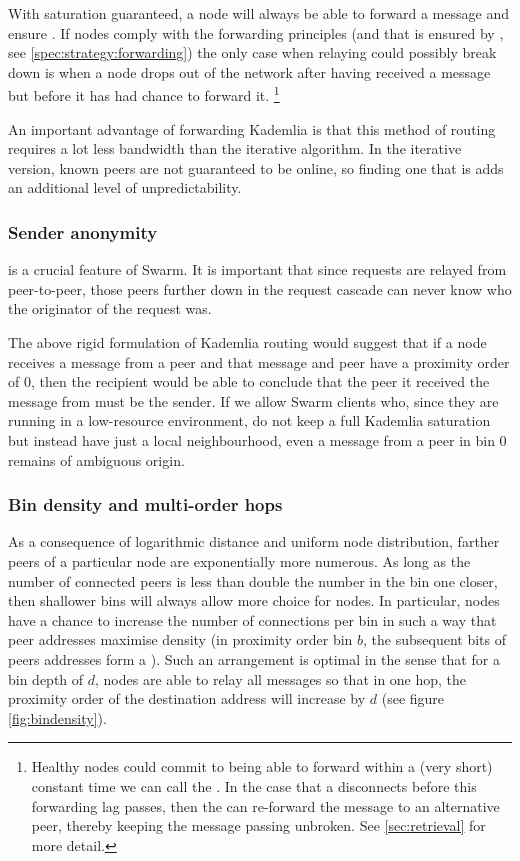 With  saturation guaranteed, a node will always be able to forward a message and ensure . If nodes comply with the forwarding principles (and that is ensured by , see \ref{spec:strategy:forwarding}) the only case when relaying could possibly break down is when a node drops out of the network after having received a message but before it has had chance to forward it.%
%
\footnote{Healthy nodes could commit to being able to forward within a (very short) constant time we can call the . In the case that a  disconnects before this forwarding lag passes, then the  can re-forward the message to an alternative peer, thereby keeping the message passing unbroken. See \ref{sec:retrieval} for more detail.
} 

An important advantage of forwarding Kademlia is that this method of routing requires a lot less bandwidth than the iterative algorithm. In the iterative version, known peers are not guaranteed to be online, so finding one that is adds an additional level of unpredictability.

\subsubsection{Sender anonymity}
 is a crucial feature of  Swarm. It is important that since requests are relayed from peer-to-peer, those peers further down in the request cascade can never know who the originator of the request was. 

The above rigid formulation of Kademlia routing would suggest that if a node receives a message from a peer and that message and peer have a proximity order of $0$, then the recipient would be able to conclude that the peer it received the message from must be the sender. If we allow  Swarm clients who, since they are running in a low-resource environment, do not keep a full Kademlia saturation but instead have just a local neighbourhood, even a message from a peer in bin $0$ remains of ambiguous origin. 

\subsubsection{Bin density and multi-order hops} \label{sec:bindensity}

As a consequence of logarithmic distance and uniform node distribution, farther peers of a particular node are exponentially more numerous. 
As long as the number of connected peers is less than double the number in the bin one closer, then shallower bins will always allow more choice for nodes. In particular, nodes have a chance to increase the number of connections per bin in such a way that peer addresses maximise density (in proximity order bin $b$, the subsequent bits of peers addresses form a ). Such an arrangement is optimal in the sense that for a bin depth of $d$, nodes are able to relay all messages so that in one hop, the proximity order of the destination address will increase by $d$ (see figure \ref{fig:bindensity}). 



